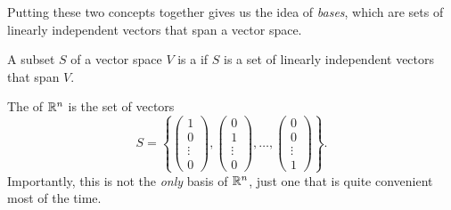 \documentclass[a4paper]{scrartcl}
\begin{document}




Putting these two concepts together gives us the idea of \emph{bases}, which are sets of linearly independent vectors that span a vector space.

\begin{definition}[Basis]
    A subset $S$ of a vector space $V$ is a  if $S$ is a set of linearly independent vectors that span $V$.
\end{definition}

\begin{example}
    The  of $\mathbb{R}^n$ is the set of vectors
    $$
    S = \left\{
        \begin{pmatrix}1 \\ 0 \\ \vdots \\ 0\end{pmatrix},
        \begin{pmatrix}0 \\ 1 \\ \vdots \\ 0\end{pmatrix},
        \dots,
        \begin{pmatrix}0 \\ 0 \\ \vdots \\ 1\end{pmatrix}
    \right\}.
    $$
    Importantly, this is not the \emph{only} basis of $\mathbb{R}^n$, just one that is quite convenient most of the time.
\end{example}
\end{document}

